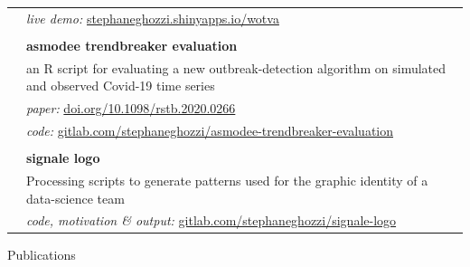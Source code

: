 \documentclass[a4paper,11pt,oneside]{article}
\begin{document}
\begin{longtable}{@{}p{3.1cm}@{}@{}p{13.9cm}@{}}
   & \emph{live demo:} \href{https://stephaneghozzi.shinyapps.io/wotva}{stephaneghozzi.shinyapps.io/wotva} \\
   & \\
   & \textbf{asmodee trendbreaker evaluation} \\
   & an R script for evaluating a new outbreak-detection algorithm on simulated and observed Covid-19 time series \\
   & \emph{paper:} \href{https://doi.org/10.1098/rstb.2020.0266}{doi.org/10.1098/rstb.2020.0266}\\
   & \emph{code:} \href{https://gitlab.com/stephaneghozzi/asmodee-trendbreaker-evaluation}{gitlab.com/stephaneghozzi/asmodee-trendbreaker-evaluation} \\
   & \\
   & \textbf{signale logo} \\
   & Processing scripts to generate patterns used for the graphic identity of a data-science team \\
   & \emph{code, motivation \& output:} \href{https://gitlab.com/stephaneghozzi/signale-logo}{gitlab.com/stephaneghozzi/signale-logo} \\
\end{longtable}

\vspace{1em}

\noindent {\color{gray}\hrule} 
   
\vspace{2em}
   
\noindent \Large{Publications}

\vspace{0.5em}

\normalsize
\nocite{*}
\begingroup
\renewcommand{\section}[2]{}


\endgroup
\end{document}
